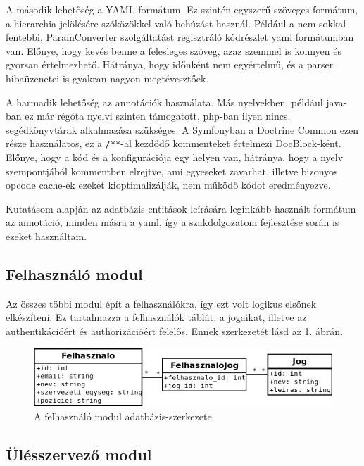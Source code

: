 \documentclass[a4paper,12pt,oneside]{report}
\begin{document}
A második lehetőség a YAML formátum. Ez szintén egyszerű szöveges formátum, a hierarchia jelölésére szóközökkel való behúzást használ. Például a nem sokkal fentebbi, ParamConverter szolgáltatást regisztráló kódrészlet yaml formátumban van. Előnye, hogy kevés benne a felesleges szöveg, azaz szemmel is könnyen és gyorsan értelmezhető. Hátránya, hogy időnként nem egyértelmű, és a parser hibaüzenetei is gyakran nagyon megtévesztőek.

A harmadik lehetőség az annotációk használata. Más nyelvekben, például java-ban ez már régóta nyelvi szinten támogatott, php-ban ilyen nincs, segédkönyvtárak alkalmazása szükséges. A Symfonyban a Doctrine Common ezen része használatos, ez a \lstinline!/**!-al kezdődő kommenteket értelmezi DocBlock-ként. Előnye, hogy a kód és a konfigurációja egy helyen van, hátránya, hogy a nyelv szempontjából kommentben elrejtve, ami egyeseket zavarhat, illetve bizonyos opcode cache-ek ezeket kioptimalizálják, nem működő kódot eredményezve.

Kutatásom alapján az adatbázis-entitások leírására leginkább használt formátum az annotáció, minden másra a yaml, így a szakdolgozatom fejlesztése során is ezeket használtam.

\subsection{Felhasználó modul}

Az összes többi modul épít a felhasználókra, így ezt volt logikus elsőnek elkészíteni. Ez tartalmazza a felhasználók táblát, a jogaikat, illetve az authentikációért és authorizációért felelős. Ennek szerkezetét lásd az \ref{fig:db-felhasznalo}. ábrán.

\begin{figure}[h]
  \includegraphics[width=\textwidth]{db-felhasznalo}
  \caption{A felhasználó modul adatbázis-szerkezete}
  \label{fig:db-felhasznalo}
\end{figure}

\subsection{Ülésszervező modul}
\end{document}
